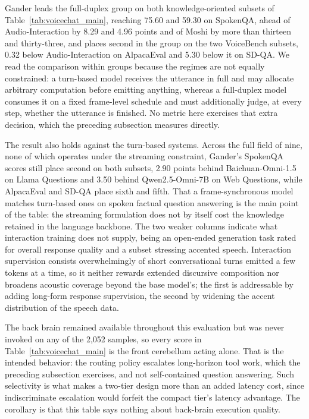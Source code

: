 

Gander leads the full-duplex group on both knowledge-oriented subsets of
Table~\ref{tab:voicechat_main}, reaching 75.60 and 59.30 on SpokenQA, ahead of Audio-Interaction
by 8.29 and 4.96 points and of Moshi by more than thirteen and thirty-three, and places second in
the group on the two VoiceBench subsets, 0.32 below Audio-Interaction on AlpacaEval and 5.30 below
it on SD-QA. We read the comparison within groups because the regimes are not equally
constrained: a turn-based model receives the utterance in full and may allocate arbitrary
computation before emitting anything, whereas a full-duplex model consumes it on a fixed
frame-level schedule and must additionally judge, at every step, whether the utterance is
finished. No metric here exercises that extra decision, which the preceding subsection measures
directly.

The result also holds against the turn-based systems. Across the full field of nine, none of
which operates under the streaming constraint, Gander's SpokenQA scores still place second on
both subsets, 2.90 points behind Baichuan-Omni-1.5 on Llama Questions and 3.50 behind
Qwen2.5-Omni-7B on Web Questions, while AlpacaEval and SD-QA place sixth and fifth. That a
frame-synchronous model matches turn-based ones on spoken factual question answering is the main
point of the table: the streaming formulation does not by itself cost the knowledge retained in
the language backbone. The two weaker columns indicate what interaction training does not supply,
being an open-ended generation task rated for overall response quality and a subset stressing
accented speech. Interaction supervision consists overwhelmingly of short conversational turns
emitted a few tokens at a time, so it neither rewards extended discursive composition nor
broadens acoustic coverage beyond the base model's; the first is addressable by adding long-form
response supervision, the second by widening the accent distribution of the speech data.

The back brain remained available throughout this evaluation but was never invoked on any of the
2{,}052 samples, so every score in Table~\ref{tab:voicechat_main} is the front cerebellum acting
alone. That is the intended behavior: the routing policy escalates long-horizon tool work, which
the preceding subsection exercises, and not self-contained question answering. Such selectivity is
what makes a two-tier design more than an added latency cost, since indiscriminate escalation
would forfeit the compact tier's latency advantage. The corollary is that this table says nothing
about back-brain execution quality.

